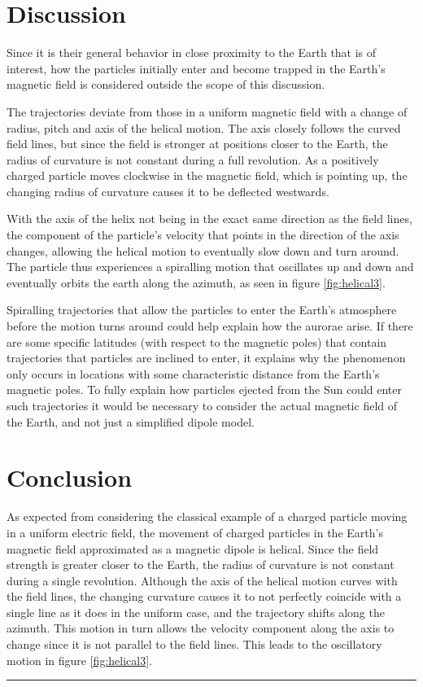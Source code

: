 \documentclass[5p,sort&compress]{elsarticle}
\begin{document}
\section{Discussion}
Since it is their general behavior in close proximity to the Earth that is of interest, how the particles initially enter and become trapped in the Earth's magnetic field is considered outside the scope of this discussion.

The trajectories deviate from those in a uniform magnetic field with a change of radius, pitch and axis of the helical motion. The axis closely follows the curved field lines, but since the field is stronger at positions closer to the Earth, the radius of curvature is not constant during a full revolution. As a positively charged particle moves clockwise in the magnetic field, which is pointing up, the changing radius of curvature causes it to be deflected westwards.

With the axis of the helix not being in the exact same direction as the field lines, the component of the particle's velocity that points in the direction of the axis changes, allowing the helical motion to eventually slow down and turn around. The particle thus experiences a spiralling motion that oscillates up and down and eventually orbits the earth along the azimuth, as seen in figure \ref{fig:helical3}.

Spiralling trajectories that allow the particles to enter the Earth's atmosphere before the motion turns around could help explain how the aurorae arise. If there are some specific latitudes (with respect to the magnetic poles) that contain trajectories that particles are inclined to enter, it explains why the phenomenon only occurs in locations with some characteristic distance from the Earth's magnetic poles. To fully explain how particles ejected from the Sun could enter such trajectories it would be necessary to consider the actual magnetic field of the Earth, and not just a simplified dipole model.

\section{Conclusion}
As expected from considering the classical example of a charged particle moving in a uniform electric field, the movement of charged particles in the Earth's magnetic field approximated as a magnetic dipole is helical. Since the field strength is greater closer to the Earth, the radius of curvature is not constant during a single revolution. Although the axis of the helical motion curves with the field lines, the changing curvature causes it to not perfectly coincide with a single line as it does in the uniform case, and the trajectory shifts along the azimuth. This motion in turn allows the velocity component along the axis to change since it is not parallel to the field lines. This leads to the oscillatory motion in figure \ref{fig:helical3}.

\begingroup
\begin{center}
\rule{2cm}{.4pt}
\end{center}
\makeatletter
{}
\makeatother


\endgroup
\end{document}
